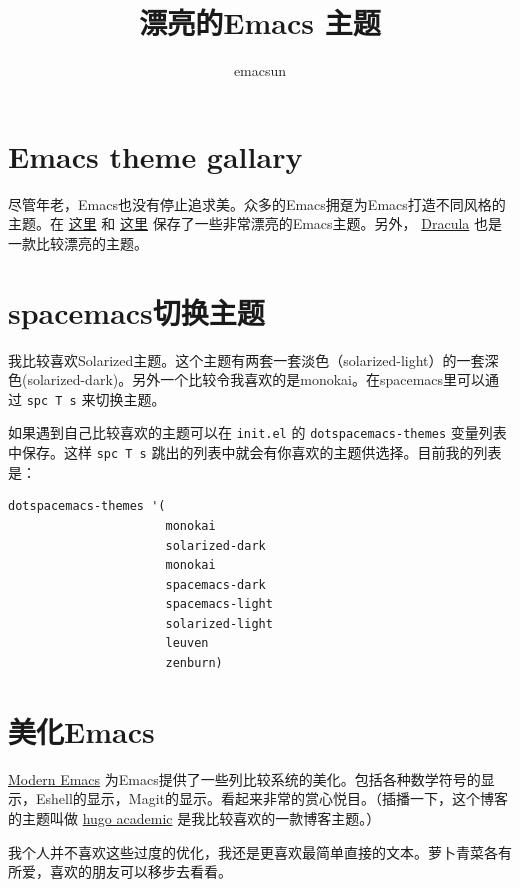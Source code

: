 \documentclass[10pt,a4paper,UTF8]{article}
\author{emacsun}
\date{}
\title{漂亮的Emacs 主题}
\begin{document}
\maketitle
\tableofcontents
{}

\section{Emacs theme gallary}
\label{sec:org4ad18bb}
尽管年老，Emacs也没有停止追求美。众多的Emacs拥趸为Emacs打造不同风格的主题。在 \href{https://emacsthemes.com/index/1.html}{这里} 和 \href{https://pawelbx.github.io/emacs-theme-gallery/}{这里} 保存了一些非常漂亮的Emacs主题。另外， \href{https://draculatheme.com/emacs/}{Dracula} 也是一款比较漂亮的主题。

\section{spacemacs切换主题}
\label{sec:orgb1b5ff2}

我比较喜欢Solarized主题。这个主题有两套一套淡色（solarized-light）的一套深色(solarized-dark)。另外一个比较令我喜欢的是monokai。在spacemacs里可以通过 \texttt{spc T s} 来切换主题。

如果遇到自己比较喜欢的主题可以在 \texttt{init.el} 的 \texttt{dotspacemacs-themes} 变量列表中保存。这样 \texttt{spc T s} 跳出的列表中就会有你喜欢的主题供选择。目前我的列表是：
\begin{verbatim}
dotspacemacs-themes '(
                      monokai
                      solarized-dark
                      monokai
                      spacemacs-dark
                      spacemacs-light
                      solarized-light
                      leuven
                      zenburn)
\end{verbatim}

\section{美化Emacs}
\label{sec:org92a1af2}

\href{http://www.modernemacs.com/}{Modern Emacs} 为Emacs提供了一些列比较系统的美化。包括各种数学符号的显示，Eshell的显示，Magit的显示。看起来非常的赏心悦目。（插播一下，这个博客的主题叫做 \href{https://draculatheme.com/emacs/}{hugo academic} 是我比较喜欢的一款博客主题。）

我个人并不喜欢这些过度的优化，我还是更喜欢最简单直接的文本。萝卜青菜各有所爱，喜欢的朋友可以移步去看看。
\end{document}
